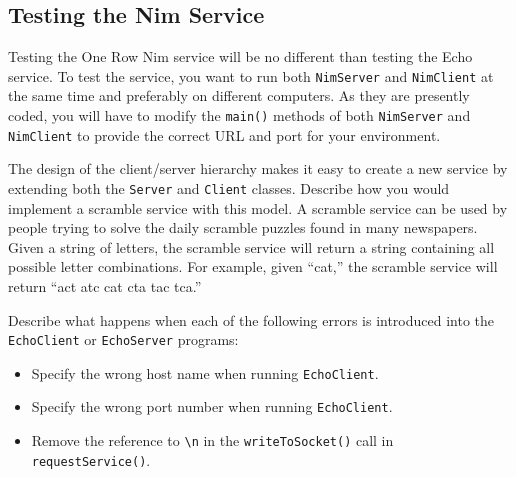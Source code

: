 
\subsection{Testing the Nim Service}
\noindent Testing the One Row Nim service will be no different
than testing the Echo service.  To test the service, you want to run
both {\tt NimServer} and {\tt NimClient} at the same time and
preferably on different computers.  As they are presently coded, you
will have to modify the {\tt main()} methods of both {\tt NimServer}
and {\tt NimClient} to provide the correct URL and port for your
environment.


\begin{SSTUDY}

\item  The design of the client/server hierarchy makes it 
easy to create a new service by extending both the {\tt Server} and
{\tt Client} classes.  Describe how you would implement a scramble
service with this model.  A scramble service can be used by people
trying to solve the daily scramble puzzles found in many newspapers.
Given a string of letters, the scramble service will return a string
containing all possible letter combinations.  For example,
given ``cat,'' the scramble service will return ``act atc cat cta tac
tca.''

\item  Describe what happens when each of the following errors is introduced
into the {\tt EchoClient} or {\tt EchoServer} programs:

\begin{itemize}
\item  Specify the wrong host name when running {\tt EchoClient}.
\item  Specify the wrong port number when running {\tt EchoClient}.
\item  Remove the reference to \verb|\n| in the {\tt writeToSocket()}
call in {\tt request\-Service()}.
\end{itemize}
\end{SSTUDY}



